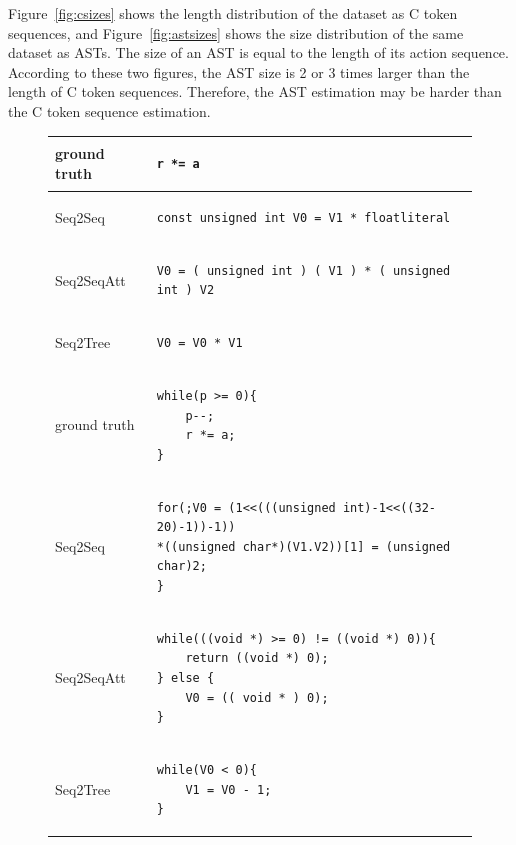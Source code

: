 \documentclass[senior,final,11pt]{iscs-thesis}
\begin{document}
Figure~\ref{fig:csizes} shows the length distribution of the dataset as C token sequences, 
and Figure~\ref{fig:astsizes} shows the size distribution of the same dataset as ASTs.
The size of an AST is equal to the length of its action sequence.
According to these two figures, the AST size is 2 or 3 times larger than the length of C token sequences.
Therefore, the AST estimation may be harder than the C token sequence estimation.

\begin{figure}
	\begin{tabular}{|l|l|} \hline
	 ground truth & 
		\begin{lstlisting}[style=Csample]
r *= a
		\end{lstlisting} \\ \hline
		Seq2Seq & 
		\begin{lstlisting}[style=Csample]
const unsigned int V0 = V1 * floatliteral
		\end{lstlisting} \\ \hline
		Seq2SeqAtt & 
		\begin{lstlisting}[style=Csample]
V0 = ( unsigned int ) ( V1 ) * ( unsigned int ) V2
		\end{lstlisting} \\ \hline
		Seq2Tree & 
		\begin{lstlisting}[style=Csample]
V0 = V0 * V1
		\end{lstlisting} \\ \hline
		\hline	
	 ground truth & 
		\begin{lstlisting}[style=Csample]
while(p >= 0){
	p--;
	r *= a;
}
		\end{lstlisting} \\ \hline
		Seq2Seq & 
		\begin{lstlisting}[style=Csample]
for(;V0 = (1<<(((unsigned int)-1<<((32-20)-1))-1))
*((unsigned char*)(V1.V2))[1] = (unsigned char)2;
}
		\end{lstlisting} \\ \hline
		Seq2SeqAtt & 
		\begin{lstlisting}[style=Csample]
while(((void *) >= 0) != ((void *) 0)){ 
	return ((void *) 0);
} else { 
	V0 = (( void * ) 0); 
}
		\end{lstlisting} \\ \hline
		Seq2Tree & 
		\begin{lstlisting}[style=Csample]
while(V0 < 0){ 
	V1 = V0 - 1;
}
		\end{lstlisting}
		 \\ \hline	\hline

\end{tabular}
\end{figure}
\end{document}
